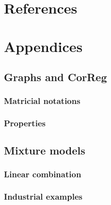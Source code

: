\documentclass[11pt,a4paper]{report}
\begin{document}
\chapter{References}
{ }

\chapter{Appendices}
	\section{Graphs and CorReg}
		\subsection{Matricial notations}
		\subsection{Properties}
	\section{Mixture models}
		\subsection{Linear combination}
		\subsection{Industrial examples}	
\end{document}

